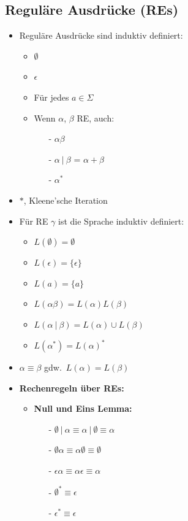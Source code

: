 \documentclass[ieeetran]{article}
\begin{document}
\subsection{Reguläre Ausdrücke (REs)} %
\label{sub:reguläre_ausdrücke}

\begin{itemize}
  \item Reguläre Ausdrücke sind induktiv definiert:
\begin{itemize}
  \item $\emptyset$
\item $\epsilon$
\item Für jedes $a \in \Sigma$
\item Wenn $\alpha$, $\beta$ RE, auch:
	\begin{itemize}
		\item[-] $\alpha \beta$
		\item[-] $\alpha \ | \ \beta$ = $\alpha + \beta$
		\item[-] $\alpha^*$
	\end{itemize}


\end{itemize}

\item $*$, Kleene'sche Iteration

\item Für RE $\gamma$ ist die Sprache induktiv definiert:
	\begin{itemize}
	  \item $L(\emptyset) = \emptyset$
	  \item $L(\epsilon) = \{\epsilon\}$
	\item $L(a) = \{a\}$
\item $L(\alpha \beta) = L(\alpha)L(\beta)$
	\item $L(\alpha \ | \ \beta) = L(\alpha) \cup L(\beta)$
	\item $L(\alpha^*) = L(\alpha)^*$
	\end{itemize}
\item $\alpha \equiv \beta$ gdw.\ $L(\alpha) = L(\beta)$
\item \textbf{Rechenregeln über REs:}
	\begin{itemize}
	  \item \textbf{Null und Eins Lemma:}
		  \begin{itemize}
			  \item[-] $\emptyset \ | \ \alpha \equiv \alpha \ | \ \emptyset \equiv \alpha$
			  \item[-] $\emptyset \alpha \equiv \alpha \emptyset \equiv \emptyset$
			  \item[-] $\epsilon \alpha \equiv \alpha \epsilon \equiv \alpha$
			  \item[-] $\emptyset^* \equiv \epsilon$
			  \item[-] $\epsilon^* \equiv \epsilon$


\end{itemize}
\end{itemize}
\end{itemize}
\end{document}
